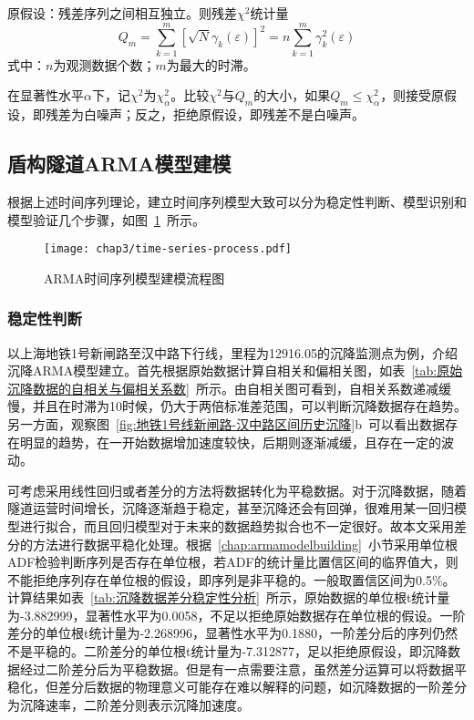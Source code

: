 原假设：残差序列之间相互独立。则残差${{\chi }^{2}}$统计量
\begin{equation}
	{{Q}_{m}}=\sum\limits_{k=1}^{m}{{{\left[ \sqrt{N}{{\gamma }_{k}}(\varepsilon ) \right]}^{2}}=n\sum\limits_{k=1}^{m}{\gamma _{k}^{2}(\varepsilon )}}
\end{equation}
式中：$n$为观测数据个数；$m$为最大的时滞。

在显著性水平$\alpha $下，记${{\chi }^{2}}$为$\chi _{\alpha }^{2}$。比较${{\chi }^{2}}$与$Q_m$的大小，如果${{Q}_{m}}\le \chi _{\alpha }^{2}$，则接受原假设，即残差为白噪声；反之，拒绝原假设，即残差不是白噪声。


\subsection{盾构隧道ARMA模型建模}

根据上述时间序列理论，建立时间序列模型大致可以分为稳定性判断、模型识别和模型验证几个步骤，如图~\ref{fig:ARMA时间序列模型建模流程图}~所示。

\begin{figure}[htb!]
    \centering
    \texttt{[image: chap3/time-series-process.pdf]}
    \caption{ARMA时间序列模型建模流程图}
    \label{fig:ARMA时间序列模型建模流程图}
\end{figure}

\subsubsection{稳定性判断}

以上海地铁1号新闸路至汉中路下行线，里程为12916.05的沉降监测点为例，介绍沉降ARMA模型建立。首先根据原始数据计算自相关和偏相关图，如表~\ref{tab:原始沉降数据的自相关与偏相关系数}~所示。由自相关图可看到，自相关系数递减缓慢，并且在时滞为10时候，仍大于两倍标准差范围，可以判断沉降数据存在趋势。另一方面，观察图~\ref{fig:地铁1号线新闸路-汉中路区间历史沉降}b~可以看出数据存在明显的趋势，在一开始数据增加速度较快，后期则逐渐减缓，且存在一定的波动。

可考虑采用线性回归或者差分的方法将数据转化为平稳数据。对于沉降数据，随着隧道运营时间增长，沉降逐渐趋于稳定，甚至沉降还会有回弹，很难用某一回归模型进行拟合，而且回归模型对于未来的数据趋势拟合也不一定很好。故本文采用差分的方法进行数据平稳化处理。根据~\ref{chap:armamodelbuilding}~小节采用单位根ADF检验判断序列是否存在单位根，若ADF的统计量比置信区间的临界值大，则不能拒绝序列存在单位根的假设，即序列是非平稳的。一般取置信区间为0.5\%。计算结果如表~\ref{tab:沉降数据差分稳定性分析}~所示，原始数据的单位根t统计量为-3.882999，显著性水平为0.0058，不足以拒绝原始数据存在单位根的假设。一阶差分的单位根t统计量为-2.268996，显著性水平为0.1880，一阶差分后的序列仍然不是平稳的。二阶差分的单位根t统计量为-7.312877，足以拒绝原假设，即沉降数据经过二阶差分后为平稳数据。但是有一点需要注意，虽然差分运算可以将数据平稳化，但差分后数据的物理意义可能存在难以解释的问题，如沉降数据的一阶差分为沉降速率，二阶差分则表示沉降加速度。


